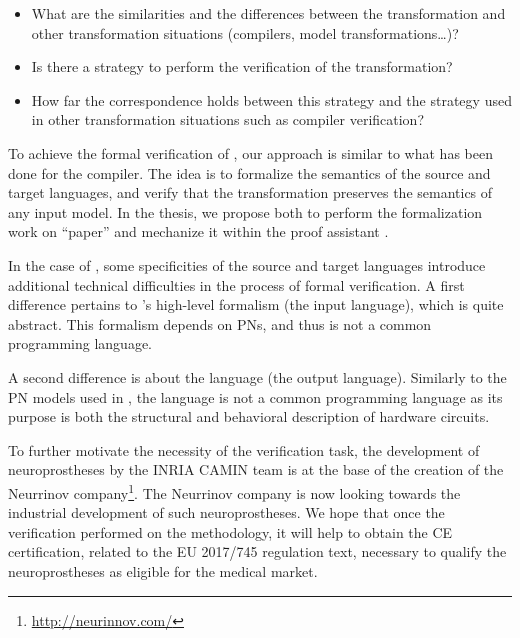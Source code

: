 \begin{itemize}
\item What are the similarities and the differences between the
  \hilecop{} transformation and other transformation situations
  (compilers, model transformations\dots)?
\item Is there a strategy to perform the verification of the
  \hilecop{} transformation?
\item How far the correspondence holds between this strategy and the
  strategy used in other transformation situations such as compiler
  verification?
\end{itemize}

To achieve the formal verification of \hilecop{}, our approach is
similar to what has been done for the \ccert{} compiler. The idea is
to formalize the semantics of the source and target languages, and
verify that the transformation preserves the semantics of any input
model. In the thesis, we propose both to perform the formalization
work on ``paper'' and mechanize it within the \coq{} proof assistant
\cite{Bertot2004}.

In the case of \hilecop{}, some specificities of the source and target
languages introduce additional technical difficulties in the process
of formal verification. A first difference pertains to \hilecop{}'s
high-level formalism (the input language), which is quite
abstract. This formalism depends on PNs, and thus is not a common
programming language.

A second difference is about the \vhdl{} language (the output
language).  Similarly to the PN models used in \hilecop{}, the \vhdl{}
language is not a common programming language as its purpose is both
the structural and behavioral description of hardware
circuits. %


To further motivate the necessity of the verification task, the
development of neuroprostheses by the INRIA CAMIN team is at the base
of the creation of the Neurrinov
company\footnote{\url{http://neurinnov.com/}}. The Neurrinov company
is now looking towards the industrial development of such
neuroprostheses. We hope that once the verification performed on the
\hilecop{} methodology, it will help to obtain the CE certification,
related to the EU 2017/745 regulation text, necessary to qualify the
neuroprostheses as eligible for the medical market.


